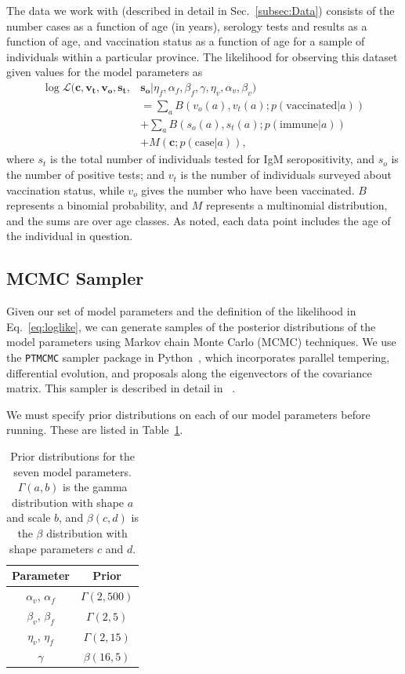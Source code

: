 \documentclass[nofootinbib,aps,pre,twocolumn,superscriptaddress,showkeys,showpacs]{revtex4-1}
\begin{document}
The data we work with (described in detail in Sec.~\ref{subsec:Data}) consists of the number cases as a function of age (in years), serology tests and results as a function of age, and vaccination status as a function of age for a sample of individuals within a particular province. The likelihood for observing this dataset given values for the model parameters as
\begin{align}
\log \mathcal{L} (\mathbf{c}, \mathbf{v_t}, \mathbf{v_o}, \mathbf{s_t},&\mathbf{s_o}|\eta_f, \alpha_f, \beta_f, \gamma, \eta_v, \alpha_v, \beta_v)\nonumber \\ 
& = \sum_aB\left(v_o(a), v_t(a); p(\mathrm{vaccinated}|a)\right) \nonumber \\
&+ \sum_a B\left(s_o(a),s_t(a);p(\mathrm{immune}|a)\right) \nonumber \\
&+ M\left(\mathbf{c};p(\mathrm{case}|a)\right),
\label{eq:loglike}
\end{align}
where $s_t$ is the total number of individuals tested for IgM seropositivity, and $s_o$ is the number of positive tests; and $v_t$ is the number of individuals surveyed about vaccination status, while $v_o$ gives the number who have been vaccinated. $B$ represents a binomial probability, and $M$ represents a multinomial distribution, and the sums are over age classes. As noted, each data point includes the age of the individual in question.

\subsection{MCMC Sampler \label{subsec:MCMC}}
Given our set of model parameters and the definition of the likelihood in Eq.~\ref{eq:loglike}, we can generate samples of the posterior distributions of the model parameters using Markov chain Monte Carlo (MCMC) techniques. We use the \texttt{PTMCMC} sampler package in Python~\cite{PTMCMC}, which incorporates parallel tempering, differential evolution, and proposals along the eigenvectors of the covariance matrix. This sampler is described in detail in ~\cite{Arzoumanian2014}.

We must specify prior distributions on each of our model parameters before running. These are listed in Table~\ref{table:priors}. 
\begin{table}
\begin{center}
\begin{tabular}{ c|c }  
Parameter & Prior \\
 \hline
 $\alpha_v$, $\alpha_f$ & $\Gamma(2,500)$ \\ 
 $\beta_v$, $\beta_f$ &$ \Gamma(2,5)$ \\ 
 $\eta_v$, $\eta_f$&$ \Gamma(2,15)$ \\ 
 $\gamma$ & $\beta(16,5)$ \\
 \hline
\end{tabular}
\caption{Prior distributions for the seven model parameters. $\Gamma(a,b)$ is the gamma distribution with shape $a$ and scale $b$, and $\beta(c,d)$ is the $\beta$ distribution with shape parameters $c$ and $d$. \label{table:priors}}
\end{center}
\end{table}
\end{document}
